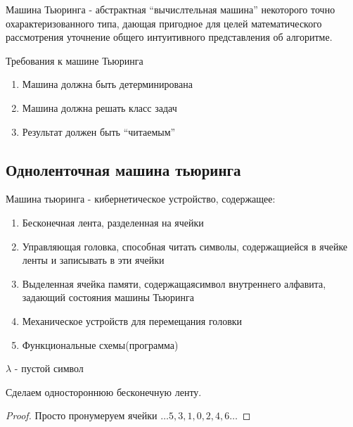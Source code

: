 \begin{definition}
  Машина Тьюринга - абстрактная ``вычислтельная машина'' некоторого точно
  охарактеризованного типа, дающая пригодное для целей математического 
  рассмотрения уточнение общего интуитивного представления об алгоритме.
\end{definition}

Требования к машине Тьюринга
\begin{enumerate}
  \item Машина должна быть детерминирована
  \item Машина должна решать класс задач
  \item Результат должен быть ``читаемым''
\end{enumerate}

\subsection{Одноленточная машина тьюринга}

\begin{definition}
  Машина тьюринга - кибернетическое устройство, содержащее:
  \begin{enumerate}
    \item Бесконечная лента, разделенная на ячейки
    \item Управляющая головка, способная читать символы, содержащиейся 
      в ячейке ленты и записывать в эти ячейки
    \item Выделенная ячейка памяти, содержащаясимвол внутреннего алфавита, 
      задающий состояния машины Тьюринга
    \item Механическое устройств для перемещания головки
    \item Функциональные схемы(программа)
  \end{enumerate}
\end{definition}

\begin{remark}
  $\lambda$ - пустой символ
\end{remark}

\begin{remark}
  Сделаем одностороннюю бесконечную ленту.
\end{remark}
\begin{proof}
  Просто пронумеруем ячейки $\dots 5, 3, 1, 0, 2, 4, 6 \dots$
\end{proof}

\begin{remark}
\end{remark}

